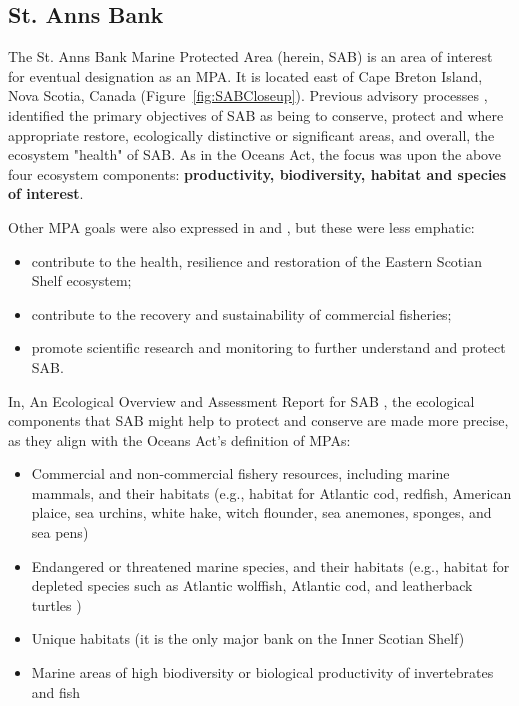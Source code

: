\documentclass[letterpaper,portrait,11pt]{scrartcl}
\numberwithin{equation}{section}		%
\numberwithin{figure}{section}		%
\numberwithin{table}{section}				%
\begin{document}
\subsection{St. Anns Bank}
The St. Anns Bank Marine Protected Area (herein, SAB) is an area of interest for eventual designation as an MPA. It is located east of Cape Breton Island, Nova Scotia, Canada (Figure~\ref{fig:SABCloseup}). Previous advisory processes \parencites{DFO:2012:conservation, Kenchington:2013:sab}, identified the primary objectives of SAB as being to conserve, protect and where appropriate restore, ecologically distinctive or significant areas, and overall, the ecosystem "health" of SAB. As in the Oceans Act, the focus was upon the above four ecosystem components: \textbf{productivity, biodiversity, habitat and species of interest}.

Other MPA goals were also expressed in \textcite{DFO:2012:conservation} and \textcite{Kenchington:2013:sab}, but these were less emphatic:

\begin{itemize}
	\item contribute to the health, resilience and restoration of the Eastern Scotian Shelf ecosystem;
	\item contribute to the recovery and sustainability of commercial fisheries; 
	\item promote scientific research and monitoring to further understand and protect SAB.
\end{itemize}

In, An Ecological Overview and Assessment Report for SAB \parencite{Ford:2013:sab},  the ecological components that SAB might help to protect and conserve are made more precise, as they align with the Oceans Act's definition of MPAs:

\begin{itemize}
	\item Commercial and non-commercial fishery resources, including marine mammals, and their habitats (e.g., habitat for Atlantic cod, redfish, American plaice, sea urchins, white hake, witch flounder, sea anemones, sponges, and sea pens)
  \item Endangered or threatened marine species, and their habitats (e.g., habitat for depleted species such as Atlantic wolffish, Atlantic cod, and leatherback turtles )
  \item Unique habitats (it is the only major bank on the Inner Scotian Shelf)
  \item Marine areas of high biodiversity or biological productivity of invertebrates and fish
\end{itemize}
\end{document}
